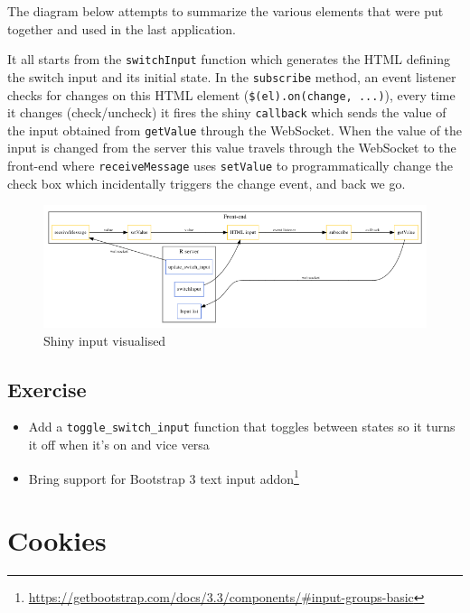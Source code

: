 \documentclass[
  10pt,
]{krantz}
\providecommand{\tightlist}{%
  \setlength{\itemsep}{0pt}\setlength{\parskip}{0pt}}
\renewcommand{\href}[2]{#2\footnote{\url{#1}}}
\begin{document}
The diagram below attempts to summarize the various elements that were put together and used in the last application.

It all starts from the \texttt{switchInput} function which generates the HTML defining the switch input and its initial state. In the \texttt{subscribe} method, an event listener checks for changes on this HTML element (\texttt{\$(el).on(\textquotesingle{}change\textquotesingle{},\ ...)}), every time it changes (check/uncheck) it fires the shiny \texttt{callback} which sends the value of the input obtained from \texttt{getValue} through the WebSocket. When the value of the input is changed from the server this value travels through the WebSocket to the front-end where \texttt{receiveMessage} uses \texttt{setValue} to programmatically change the check box which incidentally triggers the change event, and back we go.

\begin{figure}[H]

{\centering \includegraphics[width=1\linewidth]{images/04-shiny-input} 

}

\caption{Shiny input visualised}\label{fig:shiny-input-diagram}
\end{figure}

\hypertarget{shiny-input-excercise}{%
\section{Exercise}\label{shiny-input-excercise}}

\begin{itemize}
\tightlist
\item
  Add a \texttt{toggle\_switch\_input} function that toggles between states so it turns it off when it's on and vice versa
\item
  Bring support for \href{https://getbootstrap.com/docs/3.3/components/\#input-groups-basic}{Bootstrap 3 text input addon}
\end{itemize}

\hypertarget{shiny-cookies}{%
\chapter{Cookies}\label{shiny-cookies}}
\end{document}
